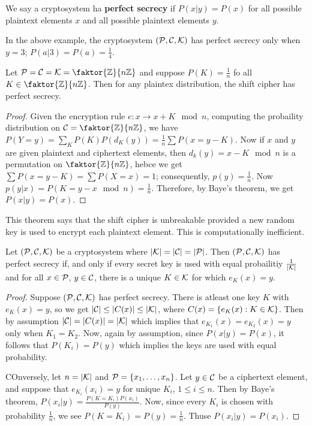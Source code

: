 \begin{definition}
    We say a cryptosystem ha \textbf{perfect secrecy} if $P(x|y)=P(x)$ for all
    possible plaintext elements $x$ and all possible plaintext elements $y$.
\end{definition}

\begin{example}
    In the above example, the cryptosystem $(\mathcal{P},\mathcal{C},\mathcal{K})$ has perfect secrecy
    only when $y=3$; $P(a|3)=P(a)=\frac{1}{4}$.
\end{example}

\begin{theorem}\label{2.1.1}
    Let $\Pc=\Cc=\Kc=\faktor{\Z}{n\Z}$ and suppose $P(K)=\frac{1}{n}$ fo all $K
    \in \faktor{\Z}{n\Z}$. Then for any plaintex distribution, the shift cipher
    has perfect secrecy.
\end{theorem}
\begin{proof}
    Given the encryption rule $e:x \rightarrow x+K \mod{n}$, computing the
    probaility distribution on $\Cc=\faktor{\Z}{n\Z}$, we have
    $P(Y=y)=\sum_K{P(K)P(d_K(y))}=\frac{1}{n}\sum{P(x=y-K)}$. Now if $x$ and $y$
    are given plaintext and ciphertext elements, then  $d_k(y)=x-K \mod{n}$ is a
    permutation on $\faktor{\Z}{n\Z}$, hebce we get
    $\sum{P(x=y-K)}=\sum{P(X=x)}=1$; consequently, $p(y)=\frac{1}{n}$. Now
    $p(y|x)=P(K=y-x \mod{n})=\frac{1}{n}$. Therefore, by Baye's theorem, we get
    $P(x|y)=P(x)$.
\end{proof}
\begin{remark}
    This theorem says that the shift cipher is unbreakable provided a new random
    key is used to encrypt each plaintext element. This is computationally
    inefficient.
\end{remark}

\begin{theorem}\label{2.1.2}
    Let $(\mathcal{P},\mathcal{C},\mathcal{K})$ be a cryptosystem where $|\mathcal{K}|=|\mathcal{C}|=|\mathcal{P}|$. Then
    $(\mathcal{P},\mathcal{C},\mathcal{K})$ has perfect secrecy if, and only if every secret key is used
    with equal probailitiy $\frac{1}{|\mathcal{K}|}$ and for all $x \in \mathcal{P}$,  $y \in
    \mathcal{C}$, there is a unique  $K \in \mathcal{K}$ for which  $e_K(x)=y$.
\end{theorem}
\begin{proof}
    Suppose $(\mathcal{P},\mathcal{C},\mathcal{K})$ has perfect secrecy. There is atleast one key $K$
    with  $e_K(x)=y$, so we get $|\mathcal{C}| \leq |C(x)| \leq |\mathcal{K}|$, where
    $C(x)=\{e_K(x) : K \in \mathcal{K}\}$. Then by assumption $|\mathcal{C}|=|C(x)|=|\mathcal{K}|$ which
    implies that $e_{K_1}(x)=e_{K_2}(x)=y$ only when $K_1=K_2$. Now, again by
    assumption, since $P(x|y)=P(x)$, it follows that $P(K_i)=P(y)$ which implies
    the keys are used with equal probability.

    COnversely, let $n=|\mathcal{K}|$ and  $\mathcal{P}=\{x_1, \dots, x_n\}$. Let $y \in \mathcal{C}$ be
    a ciphertext element, and suppose that  $e_{K_i}(x_i)=y$ for unique $K_i$,
    $1 \leq i \leq n$. Then by Baye's theorem,
    $P(x_i|y)=\frac{P(K=K_i)P(x_i)}{P(y)}$. Now, since every $K_i$ is chosen
    with probability $ \frac{1}{n}$, we see $P (K=K_i)=P(y)=\frac{1}{n}$. Thuse
    $P (x_i|y)=P(x_i)$.
\end{proof}

